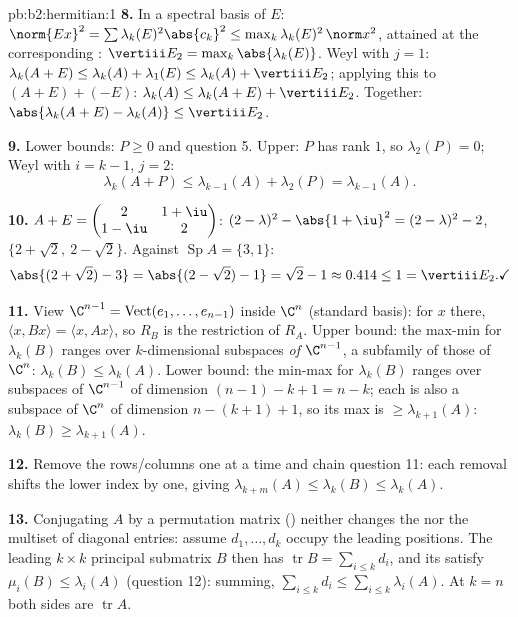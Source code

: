 \begin{solution}{pb:b2:hermitian:1}
\textbf{8.} In a spectral basis of $E$: $\norm{Ex}^2 = \sum
\lambda_k(E)^2\abs{c_k}^2 \leq \max_k\lambda_k(E)^2\,\norm
x^2$, attained at the corresponding : $\vertiii E_2
= \max_k\abs{\lambda_k(E)}$. Weyl with $j = 1$: $\lambda_k(A+E)
\leq \lambda_k(A) + \lambda_1(E) \leq \lambda_k(A) + \vertiii
E_2$; applying this to $(A+E) + (-E)$: $\lambda_k(A) \leq
\lambda_k(A+E) + \vertiii E_2$. Together:
$\abs{\lambda_k(A+E) - \lambda_k(A)} \leq \vertiii E_2$.

\textbf{9.} Lower bounds: $P \geq 0$ and question 5. Upper: $P$
has rank $1$, so $\lambda_2(P) = 0$; Weyl with $i = k-1$, $j =
2$:
\[
\lambda_k(A + P) \leq \lambda_{k-1}(A) + \lambda_2(P)
= \lambda_{k-1}(A) .
\]

\textbf{10.} $A + E = \begin{pmatrix} 2 & 1+\iu\\ 1-\iu &
2\end{pmatrix}$:  $(2-\lambda)^2 -
\abs{1+\iu}^2 = (2-\lambda)^2 - 2$,  $\{2 + \sqrt2,\ 2
- \sqrt2\}$. Against $\operatorname{Sp}A = \{3, 1\}$:
\[
\abs{(2+\sqrt2) - 3} = \abs{(2-\sqrt2) - 1} = \sqrt2 - 1
\approx 0.414 \leq 1 = \vertiii E_2 . \checkmark
\]

\textbf{11.} View $\C^{n-1} = \operatorname{Vect}(e_1, \dots,
e_{n-1})$ inside $\C^n$ (standard basis): for $x$ there,
$\langle x, Bx\rangle = \langle x, Ax\rangle$, so $R_B$ is the
restriction of $R_A$. Upper bound: the max-min for $\lambda_k
(B)$ ranges over $k$-dimensional subspaces \emph{of}
$\C^{n-1}$, a subfamily of those of $\C^n$: $\lambda_k(B) \leq
\lambda_k(A)$. Lower bound: the min-max for $\lambda_k(B)$
ranges over subspaces of $\C^{n-1}$ of dimension $(n-1)-k+1 =
n-k$; each is also a subspace of $\C^n$ of dimension $n -
(k+1) + 1$, so its max is $\geq \lambda_{k+1}(A)$:
$\lambda_k(B) \geq \lambda_{k+1}(A)$.

\textbf{12.} Remove the rows/columns one at a time and chain
question 11: each removal shifts the lower index by one, giving
$\lambda_{k+m}(A) \leq \lambda_k(B) \leq \lambda_k(A)$.

\textbf{13.} Conjugating $A$ by a permutation matrix ()
neither changes the  nor the multiset of diagonal
entries: assume $d_1, \dots, d_k$ occupy the leading positions.
The leading $k\times k$ principal submatrix $B$ then has
$\operatorname{tr} B = \sum_{i\leq k}d_i$, and its 
satisfy $\mu_i(B) \leq \lambda_i(A)$ (question 12): summing,
$\sum_{i\leq k}d_i \leq \sum_{i\leq k}\lambda_i(A)$. At $k =
n$ both sides are $\operatorname{tr} A$.


\end{solution}
